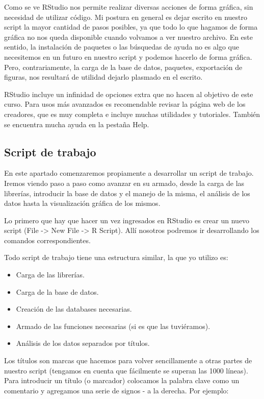 \documentclass[
]{article}
\providecommand{\tightlist}{%
  \setlength{\itemsep}{0pt}\setlength{\parskip}{0pt}}
\begin{document}
Como se ve RStudio nos permite realizar diversas acciones de forma
gráfica, sin necesidad de utilizar código. Mi postura en general es
dejar escrito en nuestro script la mayor cantidad de pasos posibles, ya
que todo lo que hagamos de forma gráfica no nos queda disponible cuando
volvamos a ver nuestro archivo. En este sentido, la instalación de
paquetes o las búsquedas de ayuda no es algo que necesitemos en un
futuro en nuestro script y podemos hacerlo de forma gráfica. Pero,
contrariamente, la carga de la base de datos, paquetes, exportación de
figuras, nos resultará de utilidad dejarlo plasmado en el escrito.

RStudio incluye un infinidad de opciones extra que no hacen al objetivo
de este curso. Para usos más avanzados es recomendable revisar la página
web de los creadores, que es muy completa e incluye muchas utilidades y
tutoriales. También se encuentra mucha ayuda en la pestaña Help.

\subsection{Script de trabajo}\label{script-de-trabajo}

En este apartado comenzaremos propiamente a desarrollar un script de
trabajo. Iremos viendo paso a paso como avanzar en su armado, desde la
carga de las librerías, introducir la base de datos y el manejo de la
misma, el análisis de los datos hasta la visualización gráfica de los
mismos.

Lo primero que hay que hacer un vez ingresados en RStudio es crear un
nuevo script (File -\textgreater{} New File -\textgreater{} R Script).
Allí nosotros podremos ir desarrollando los comandos correspondientes.

Todo script de trabajo tiene una estructura similar, la que yo utilizo
es:

\begin{itemize}
\tightlist
\item
  Carga de las librerías.
\item
  Carga de la base de datos.
\item
  Creación de las databases necesarias.
\item
  Armado de las funciones necesarias (si es que las tuviéramos).
\item
  Análisis de los datos separados por títulos.
\end{itemize}

Los títulos son marcas que hacemos para volver sencillamente a otras
partes de nuestro script (tengamos en cuenta que fácilmente se superan
las 1000 líneas). Para introducir un título (o marcador) colocamos la
palabra clave como un comentario y agregamos una serie de signos - a la
derecha. Por ejemplo:
\end{document}
